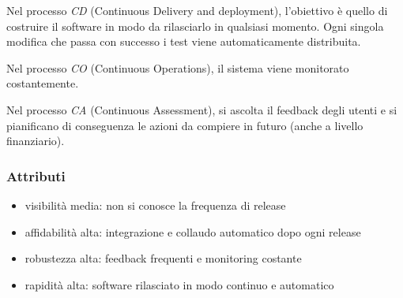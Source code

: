 \documentclass[11pt]{article}
\begin{document}
Nel processo \textit{CD} (Continuous Delivery and deployment), l'obiettivo è quello di costruire il software in modo da 
rilasciarlo in qualsiasi momento. Ogni singola modifica che passa con successo i test viene automaticamente distribuita.

Nel processo \textit{CO} (Continuous Operations), il sistema viene monitorato costantemente.

Nel processo \textit{CA} (Continuous Assessment), si ascolta il feedback degli utenti e si pianificano di conseguenza le 
azioni da compiere in futuro (anche a livello finanziario).
\subsubsection*{Attributi}
\begin{itemize}
    \item visibilità media: non si conosce la frequenza di release 
    \item affidabilità alta: integrazione e collaudo automatico dopo ogni release 
    \item robustezza alta: feedback frequenti e monitoring costante 
    \item rapidità alta: software rilasciato in modo continuo e automatico
\end{itemize}
\end{document}
